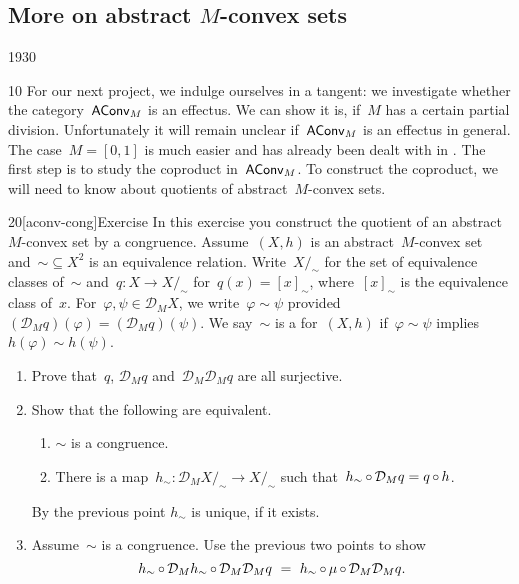\subsection{More on abstract $M$-convex sets}\label{more-aconvm}
\begin{parsec}{1930}%
\begin{point}{10}%
For our next project,
    we indulge ourselves in a tangent:
    we investigate whether the category~$\mathsf{AConv}_M$ is an effectus.
We can show it is, if~$M$ has a certain partial division.
Unfortunately it will remain unclear if~$\mathsf{AConv}_M$ is an effectus in general.
The case~$M=[0,1]$ is much easier and has already been dealt with
        in \cite{statesofconvexsets}. 
The first step is to study the coproduct in~$\mathsf{AConv}_M$.
To construct the coproduct, we will need to know
    about quotients of abstract~$M$-convex sets.
\end{point}
\begin{point}{20}[aconv-cong]{Exercise}%
In this exercise you construct the quotient of an
    abstract~$M$-convex set by a congruence.
Assume~$(X,h)$ is an abstract~$M$-convex set
    and~${\sim} \subseteq X^2$ is an equivalence relation.
Write~$X/_\sim$ for the set of equivalence classes
    of~$\sim$
    and~$q\colon X \to X/_\sim$
    for~$q(x) = [x]_\sim$, where~$[x]_\sim$ is the equivalence class of~$x$.
For~$\varphi,\psi \in \mathcal{D}_M X$,
    we write~$\varphi \sim \psi$
    provided~$(\mathcal{D}_M q)(\varphi) = (\mathcal{D}_M q)(\psi)$.
We say~$\sim$ is a  for~$(X,h)$
if~$\varphi \sim \psi$ implies~$h(\varphi) \sim h(\psi)$.
\begin{enumerate}
\item
Prove that~$q$, $\mathcal{D}_M q$ and~$\mathcal{D}_M \mathcal{D}_M q$
    are all surjective.
\item
Show that the following are equivalent.
\begin{enumerate}
\item
$\sim$ is a congruence.
\item
There is a map~$h_\sim \colon \mathcal{D}_M X/_\sim \to X/_\sim$
    such that~$h_\sim \mathop{\circ} \mathcal{D}_M q = q \mathop{\circ} h$.
\end{enumerate}
By the previous point $h_\sim$ is unique, if it exists.
\item
Assume~$\sim$ is a congruence.
Use the previous two points to show
\begin{equation*}
h_\sim \after \mathcal{D}_M h_\sim \after \mathcal{D}_M \mathcal{D}_M q
            \ =\  h_\sim \after \mu \after \mathcal{D}_M \mathcal{D}_M q.

\end{equation*}
\end{enumerate}
\end{point}
\end{parsec}
